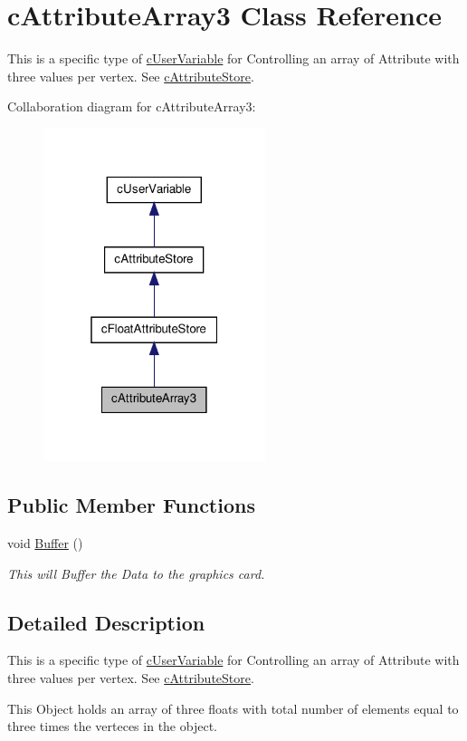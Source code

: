 \hypertarget{classc_attribute_array3}{
\section{cAttributeArray3 Class Reference}
\label{classc_attribute_array3}
}


This is a specific type of \hyperlink{classc_user_variable}{cUserVariable} for Controlling an array of Attribute with three values per vertex. See \hyperlink{classc_attribute_store}{cAttributeStore}.  




Collaboration diagram for cAttributeArray3:\nopagebreak
\begin{figure}[H]
\begin{center}
\leavevmode
\includegraphics[width=184pt]{classc_attribute_array3__coll__graph}
\end{center}
\end{figure}
\subsection*{Public Member Functions}
\begin{DoxyCompactItemize}
\item 
\hypertarget{classc_attribute_array3_a2c31ff21d2cc86613b8e2fa8da1683e3}{
void \hyperlink{classc_attribute_array3_a2c31ff21d2cc86613b8e2fa8da1683e3}{Buffer} ()}
\label{classc_attribute_array3_a2c31ff21d2cc86613b8e2fa8da1683e3}

\begin{DoxyCompactList}\small\item\em This will Buffer the Data to the graphics card. \end{DoxyCompactList}\end{DoxyCompactItemize}


\subsection{Detailed Description}
This is a specific type of \hyperlink{classc_user_variable}{cUserVariable} for Controlling an array of Attribute with three values per vertex. See \hyperlink{classc_attribute_store}{cAttributeStore}. 

This Object holds an array of three floats with total number of elements equal to three times the verteces in the object. 